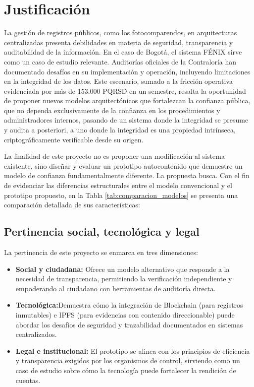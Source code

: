 \section{\large Justificación}
La gestión de registros públicos, como los fotocomparendos, en arquitecturas centralizadas presenta debilidades en materia de seguridad, transparencia y auditabilidad de la información. En el caso de Bogotá, el sistema FÉNIX sirve como un caso de estudio relevante. Auditorías oficiales de la Contraloría \parencite{Informe 170100-0054-24} \parencite{Informe de Cumplimiento No. 90, 2023} han documentado desafíos en su implementación y operación, incluyendo limitaciones en la integridad de los datos. Este escenario, sumado a la fricción operativa evidenciada por más de 153.000 PQRSD en un semestre, resalta la oportunidad de proponer nuevos modelos arquitectónicos que fortalezcan la confianza pública, que no dependa exclusivamente de la confianza en los procedimientos y administradores internos, pasando de un sistema donde la integridad se presume y audita a posteriori, a uno donde la integridad es una propiedad intrínseca, criptográficamente verificable desde su origen.

La finalidad de este proyecto no es proponer una modificación al sistema existente, sino diseñar y evaluar un prototipo autocontenido que demuestre un modelo de confianza fundamentalmente diferente. La propuesta busca. Con el fin de evidenciar las diferencias estructurales entre el modelo convencional y el prototipo propuesto, en la Tabla \ref{tab:comparacion_modelos} se presenta una comparación detallada de sus características:



\subsection{Pertinencia social, tecnológica y legal} 
La pertinencia de este proyecto se enmarca en tres dimensiones:
\begin{itemize}
\item \textbf{Social y ciudadana:} Ofrece un modelo alternativo que responde a la necesidad de transparencia, permitiendo la verificación independiente y empoderando al ciudadano con herramientas de auditoría directa.
\item \textbf{Tecnológica:}Demuestra cómo la integración de Blockchain (para registros inmutables) e IPFS (para evidencias con contenido direccionable) puede abordar los desafíos de seguridad y trazabilidad documentados en sistemas centralizados.
\item \textbf{Legal e institucional:} El prototipo se alinea con los principios de eficiencia y transparencia exigidos por los organismos de control, sirviendo como un caso de estudio sobre cómo la tecnología puede fortalecer la rendición de cuentas.
\end{itemize}

